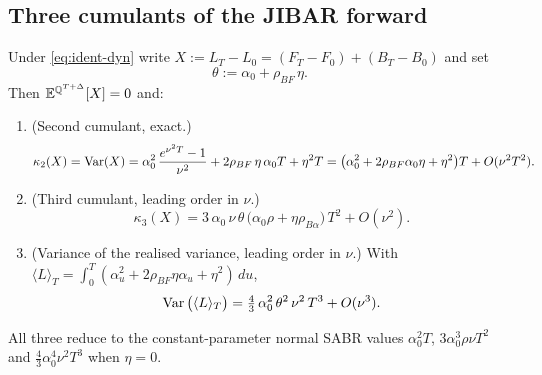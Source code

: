 \documentclass[../../../main.tex]{subfiles}
\begin{document}
\subsection{Three cumulants of the JIBAR forward}

\begin{lemma}\label{lem:ident-cumulants}
Under \eqref{eq:ident-dyn} write $X:=L_T-L_0=(F_T-F_0)+(B_T-B_0)$ and set
\[
\theta:=\alpha_0+\rho_{BF}\,\eta .
\]
Then $\mathbb{E}^{\mathbb{Q}^{T+\Delta}}[X]=0$ and:
\begin{enumerate}[nosep,label=(\roman*)]
\item (Second cumulant, exact.)
\begin{equation}\label{eq:ident-kappa2}
\kappa_2(X)=\operatorname{Var}(X)=\alpha_0^2\,\frac{e^{\nu^2T}-1}{\nu^2}+2\rho_{BF}\,\eta\,\alpha_0T+\eta^2T
=\big(\alpha_0^2+2\rho_{BF}\alpha_0\eta+\eta^2\big)T+O(\nu^2T^2).
\end{equation}
\item (Third cumulant, leading order in $\nu$.)
\begin{equation}\label{eq:ident-kappa3}
\kappa_3(X)=3\,\alpha_0\,\nu\,\theta\,\big(\alpha_0\rho+\eta\rho_{B\alpha}\big)\,T^2+O(\nu^2).
\end{equation}
\item (Variance of the realised variance, leading order in $\nu$.) With $\langle L\rangle_T=\int_0^T(\alpha_u^2+2\rho_{BF}\eta\alpha_u+\eta^2)\,du$,
\begin{equation}\label{eq:ident-varV}
\operatorname{Var}\big(\langle L\rangle_T\big)=\tfrac43\,\alpha_0^2\,\theta^2\,\nu^2\,T^3+O(\nu^3).
\end{equation}
\end{enumerate}
All three reduce to the constant-parameter normal SABR values $\alpha_0^2T$, $3\alpha_0^3\rho\nu T^2$ and $\tfrac43\alpha_0^4\nu^2T^3$ when $\eta=0$.
\end{lemma}
\end{document}

